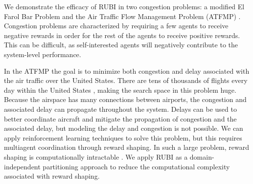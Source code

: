 \documentclass[smallcondensed]{svjour3}
\begin{document}
We demonstrate the efficacy of RUBI in two congestion problems: a modified El Farol Bar Problem \cite{BarProblem} and the Air Traffic Flow Management Problem (ATFMP) \cite{Agogino:2009:EEM:1570256.1570258,Curran:2013:AHC:2484920.2485183,Rios}. Congestion problems are characterized by requiring a few agents to receive negative rewards in order for the rest of the agents to receive positive rewards. This can be difficult, as self-interested agents will negatively contribute to the system-level performance.

In the ATFMP the goal is to minimize both congestion and delay associated with the air traffic over the United States. There are tens of thousands of flights every day within the United States \cite{faa05}, making the search space in this problem huge. Because the airspace has many connections between airports, the congestion and associated delay can propagate throughout the system. Delays can be used to better coordinate aircraft and mitigate the propagation of congestion and the associated delay, but modeling the delay and congestion is not possible. We can apply reinforcement learning techniques to solve this problem, but this requires multiagent coordination through reward shaping. In such a large problem, reward shaping is computationally intractable \cite{Curran:2013:AHC:2484920.2485183}. We apply RUBI as a domain-independent partitioning approach to reduce the computational complexity associated with reward shaping.


 
\end{document}
